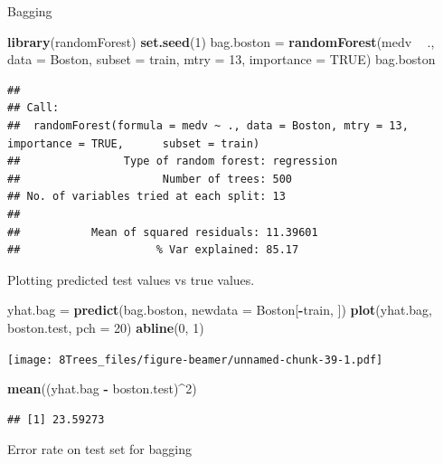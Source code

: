 \documentclass[10pt,ignorenonframetext,]{beamer}
\newenvironment{Shaded}{\begin{snugshade}}{\end{snugshade}}
\newcommand{\KeywordTok}[1]{\textcolor[rgb]{0.13,0.29,0.53}{\textbf{#1}}}
\newcommand{\DataTypeTok}[1]{\textcolor[rgb]{0.13,0.29,0.53}{#1}}
\newcommand{\DecValTok}[1]{\textcolor[rgb]{0.00,0.00,0.81}{#1}}
\newcommand{\StringTok}[1]{\textcolor[rgb]{0.31,0.60,0.02}{#1}}
\newcommand{\OtherTok}[1]{\textcolor[rgb]{0.56,0.35,0.01}{#1}}
\newcommand{\OperatorTok}[1]{\textcolor[rgb]{0.81,0.36,0.00}{\textbf{#1}}}
\newcommand{\NormalTok}[1]{#1}
\begin{document}
\begin{frame}[fragile]

\begin{block}{Bagging}

\begin{Shaded}
\begin{Highlighting}[]
\KeywordTok{library}\NormalTok{(randomForest)}
\KeywordTok{set.seed}\NormalTok{(}\DecValTok{1}\NormalTok{)}
\NormalTok{bag.boston =}\StringTok{ }\KeywordTok{randomForest}\NormalTok{(medv }\OperatorTok{~}\StringTok{ }\NormalTok{., }\DataTypeTok{data =}\NormalTok{ Boston, }\DataTypeTok{subset =}\NormalTok{ train, }
    \DataTypeTok{mtry =} \DecValTok{13}\NormalTok{, }\DataTypeTok{importance =} \OtherTok{TRUE}\NormalTok{)}
\NormalTok{bag.boston}
\end{Highlighting}
\end{Shaded}

\begin{verbatim}
## 
## Call:
##  randomForest(formula = medv ~ ., data = Boston, mtry = 13, importance = TRUE,      subset = train) 
##                Type of random forest: regression
##                      Number of trees: 500
## No. of variables tried at each split: 13
## 
##           Mean of squared residuals: 11.39601
##                     % Var explained: 85.17
\end{verbatim}

Plotting predicted test values vs true values.

\begin{Shaded}
\begin{Highlighting}[]
\NormalTok{yhat.bag =}\StringTok{ }\KeywordTok{predict}\NormalTok{(bag.boston, }\DataTypeTok{newdata =}\NormalTok{ Boston[}\OperatorTok{-}\NormalTok{train, ])}
\KeywordTok{plot}\NormalTok{(yhat.bag, boston.test, }\DataTypeTok{pch =} \DecValTok{20}\NormalTok{)}
\KeywordTok{abline}\NormalTok{(}\DecValTok{0}\NormalTok{, }\DecValTok{1}\NormalTok{)}
\end{Highlighting}
\end{Shaded}

\texttt{[image: 8Trees\_files/figure-beamer/unnamed-chunk-39-1.pdf]}

\begin{Shaded}
\begin{Highlighting}[]
\KeywordTok{mean}\NormalTok{((yhat.bag }\OperatorTok{-}\StringTok{ }\NormalTok{boston.test)}\OperatorTok{^}\DecValTok{2}\NormalTok{)}
\end{Highlighting}
\end{Shaded}

\begin{verbatim}
## [1] 23.59273
\end{verbatim}

Error rate on test set for bagging

\end{block}

\end{frame}
\end{document}
